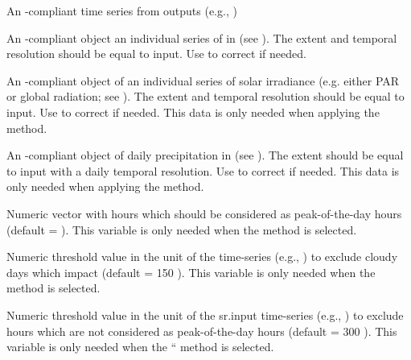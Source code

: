 \documentclass[a4paper]{book}
\begin{document}
\begin{Arguments}
\begin{ldescription}
\item[\code{input}] An -compliant time series from  outputs
(e.g., )

\item[\code{vpd.input}] An -compliant object an individual series of  in  (see ).
The extent and temporal resolution should be equal to input.
Use  to correct if needed.

\item[\code{sr.input}] An -compliant object of an individual series of solar irradiance
(e.g. either PAR or global radiation; see ).
The extent and temporal resolution should be equal to input. Use  to correct if needed.
This data is only needed when applying the  method.

\item[\code{prec.input}] An -compliant object of daily precipitation in  (see ).
The extent should be equal to input with a daily temporal resolution.
Use  to correct if needed.
This data is only needed when applying the  method.

\item[\code{peak.hours}] Numeric vector with hours which should be considered as peak-of-the-day hours
(default = ).
This variable is only needed when the  method is selected.

\item[\code{low.sr}] Numeric threshold value in the unit of the  time-series (e.g., )
to exclude cloudy days which impact  (default = 150  ).
This variable is only needed when the  method is selected.

\item[\code{peak.sr}] Numeric threshold value in the unit of the sr.input time-series (e.g.,  )
to exclude hours which are not considered as peak-of-the-day hours (default = 300  ).
This variable is only needed when the “ method is selected.


\end{ldescription}
\end{Arguments}
\end{document}
